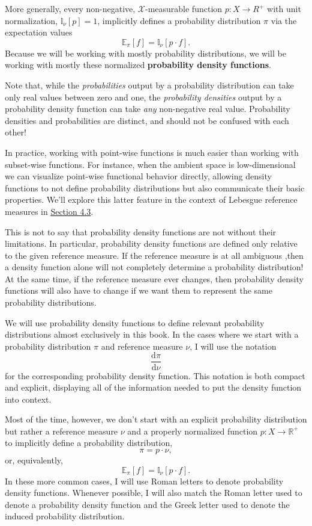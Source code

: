 \documentclass[
  letterpaper,
  DIV=11,
  numbers=noendperiod]{scrartcl}
\begin{document}
More generally, every non-negative, \(\mathcal{X}\)-measurable function
\(p : X \rightarrow R^{+}\) with unit normalization,
\(\mathbb{I}_{\nu} [ p ] = 1\), implicitly defines a probability
distribution \(\pi\) via the expectation values \[
\mathbb{E}_{\pi}[f] = \mathbb{I}_{\nu} \left[ p \cdot f \right].
\] Because we will be working with mostly probability distributions, we
will be working with mostly these normalized \textbf{probability density
functions}.

Note that, while the \emph{probabilities} output by a probability
distribution can take only real values between zero and one, the
\emph{probability densities} output by a probability density function
can take \emph{any} non-negative real value. Probability densities and
probabilities are distinct, and should not be confused with each other!

In practice, working with point-wise functions is much easier than
working with subset-wise functions. For instance, when the ambient space
is low-dimensional we can visualize point-wise functional behavior
directly, allowing density functions to not define probability
distributions but also communicate their basic properties. We'll explore
this latter feature in the context of Lebesgue reference measures in
\hyperref[sec:visualizing]{Section 4.3}.

This is not to say that probability density functions are not without
their limitations. In particular, probability density functions are
defined only relative to the given reference measure. If the reference
measure is at all ambiguous ,then a density function alone will not
completely determine a probability distribution! At the same time, if
the reference measure ever changes, then probability density functions
will also have to change if we want them to represent the same
probability distributions.

We will use probability density functions to define relevant probability
distributions almost exclusively in this book. In the cases where we
start with a probability distribution \(\pi\) and reference measure
\(\nu\), I will use the notation \[
\frac{ \mathrm{d} \pi}{ \mathrm{d} \nu}
\] for the corresponding probability density function. This notation is
both compact and explicit, displaying all of the information needed to
put the density function into context.

Most of the time, however, we don't start with an explicit probability
distribution but rather a reference measure \(\nu\) and a properly
normalized function \(p : X \rightarrow \mathbb{R}^{+}\) to implicitly
define a probability distribution, \[
\pi = p \cdot \nu,
\] or, equivalently, \[
\mathbb{E}_{\pi}[f] = \mathbb{I}_{\nu}[p \cdot f].
\] In these more common cases, I will use Roman letters to denote
probability density functions. Whenever possible, I will also match the
Roman letter used to denote a probability density function and the Greek
letter used to denote the induced probability distribution.
\end{document}

